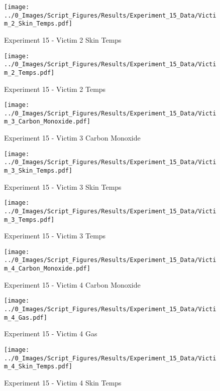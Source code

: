 	\clearpage

	\begin{figure}[H]
		\centering
		\texttt{[image: ../0\_Images/Script\_Figures/Results/Experiment\_15\_Data/Victim\_2\_Skin\_Temps.pdf]}
		\caption[]{Experiment 15 - Victim 2 Skin Temps}
	\end{figure}
 

	\begin{figure}[H]
		\centering
		\texttt{[image: ../0\_Images/Script\_Figures/Results/Experiment\_15\_Data/Victim\_2\_Temps.pdf]}
		\caption[]{Experiment 15 - Victim 2 Temps}
	\end{figure}
 
	\clearpage

	\begin{figure}[H]
		\centering
		\texttt{[image: ../0\_Images/Script\_Figures/Results/Experiment\_15\_Data/Victim\_3\_Carbon\_Monoxide.pdf]}
		\caption[]{Experiment 15 - Victim 3 Carbon Monoxide}
	\end{figure}
 

	\begin{figure}[H]
		\centering
		\texttt{[image: ../0\_Images/Script\_Figures/Results/Experiment\_15\_Data/Victim\_3\_Skin\_Temps.pdf]}
		\caption[]{Experiment 15 - Victim 3 Skin Temps}
	\end{figure}
 
	\clearpage

	\begin{figure}[H]
		\centering
		\texttt{[image: ../0\_Images/Script\_Figures/Results/Experiment\_15\_Data/Victim\_3\_Temps.pdf]}
		\caption[]{Experiment 15 - Victim 3 Temps}
	\end{figure}
 

	\begin{figure}[H]
		\centering
		\texttt{[image: ../0\_Images/Script\_Figures/Results/Experiment\_15\_Data/Victim\_4\_Carbon\_Monoxide.pdf]}
		\caption[]{Experiment 15 - Victim 4 Carbon Monoxide}
	\end{figure}
 
	\clearpage

	\begin{figure}[H]
		\centering
		\texttt{[image: ../0\_Images/Script\_Figures/Results/Experiment\_15\_Data/Victim\_4\_Gas.pdf]}
		\caption[]{Experiment 15 - Victim 4 Gas}
	\end{figure}
 

	\begin{figure}[H]
		\centering
		\texttt{[image: ../0\_Images/Script\_Figures/Results/Experiment\_15\_Data/Victim\_4\_Skin\_Temps.pdf]}
		\caption[]{Experiment 15 - Victim 4 Skin Temps}
	\end{figure}
 
